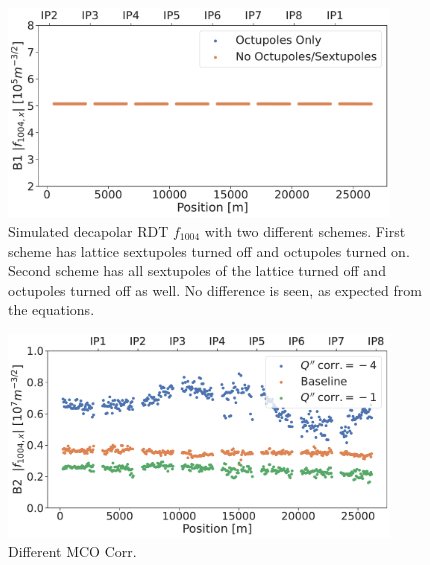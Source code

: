 \begin{figure}[H]
    \centering
    \includegraphics[width=0.9\textwidth]{./images/f1004/f1004_no_ms.pdf}
    \caption{Simulated decapolar RDT $f_{1004}$ with two different schemes. First scheme has
    lattice sextupoles turned off and octupoles turned on. Second scheme has all sextupoles of the
    lattice turned off and octupoles turned off as well. No difference is seen, as expected from
    the equations.}
    \label{}
\end{figure}

\begin{figure}[H]
    \centering
    \includegraphics[width=0.9\textwidth]{./images/f1004/f1004x_mco_corr.pdf}
    \caption{Different MCO Corr.}
    \label{decapoles:rdts:measured_f1004_mco}
\end{figure}